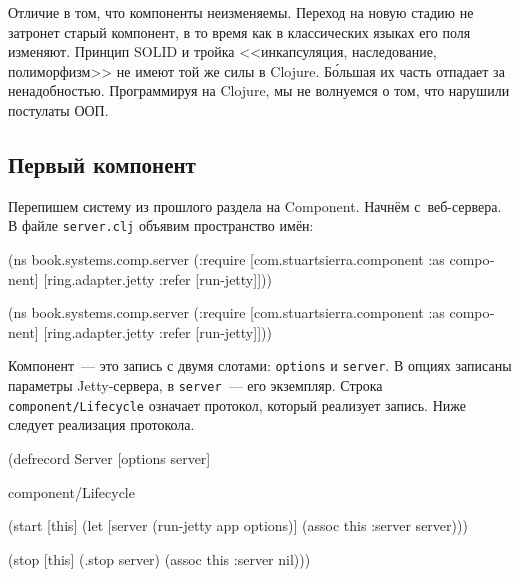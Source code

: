 
Отличие в том, что компоненты неизменяемы. Переход на новую стадию не затронет
старый компонент, в то время как в классических языках его поля
изменяют. Принцип SOLID и тройка <<инкапсуляция, наследование, полиморфизм>> не
имеют той же силы в Clojure. Б\'{о}льшая их часть отпадает за
ненадобностью. Программируя на Clojure, мы не волнуемся о том, что нарушили
постулаты ООП.

\subsection{Первый компонент}

Перепишем систему из прошлого раздела на Component. Начнём с~веб-сервера. В
файле \verb|server.clj| объявим пространство имён:

\ifnarrow

\begin{english}
  \begin{clojure}
(ns book.systems.comp.server
  (:require
   [com.stuartsierra.component
    :as component]
   [ring.adapter.jetty
    :refer [run-jetty]]))
  \end{clojure}
\end{english}

\else

\begin{english}
  \begin{clojure}
(ns book.systems.comp.server
  (:require
   [com.stuartsierra.component :as component]
   [ring.adapter.jetty :refer [run-jetty]]))
  \end{clojure}
\end{english}

\fi

Компонент~--- это запись с двумя слотами: \verb|options| и \verb|server|. В
опциях записаны параметры Jetty-сервера, в \verb|server|~--- его
экземпляр. Строка \verb|component/Lifecycle| означает протокол, который
реализует запись. Ниже следует реализация протокола.

\ifnarrow

\begin{english}
  \begin{clojure}
(defrecord Server [options server]

  component/Lifecycle

  (start [this]
    (let [server (run-jetty app
                   options)]
      (assoc this :server server)))

  (stop [this]
    (.stop server)
    (assoc this :server nil)))
  \end{clojure}
\end{english}


